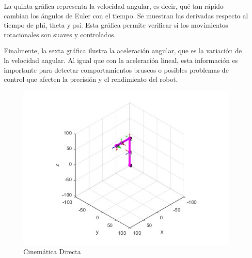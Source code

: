 La quinta gráfica representa la velocidad angular, es decir, qué tan rápido cambian los ángulos de Euler con el tiempo. Se muestran las derivadas respecto al tiempo de phi, theta y psi. Esta gráfica permite verificar si los movimientos rotacionales son suaves y controlados.

Finalmente, la sexta gráfica ilustra la aceleración angular, que es la variación de la velocidad angular. Al igual que con la aceleración lineal, esta información es importante para detectar comportamientos bruscos o posibles problemas de control que afecten la precisión y el rendimiento del robot.

\begin{figure}
	\centering
	\includegraphics[width=0.7\linewidth]{img/cinematicadirecta}
	\caption{Cinemática Directa}
	\label{fig:cinematicadirecta}
\end{figure}

